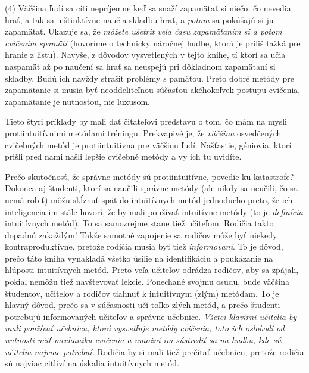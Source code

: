 (4) Väčšina ľudí sa cíti nepríjemne keď sa snaží zapamätať si niečo, čo nevedia hrať, a tak sa inštinktívne naučia skladbu hrať, a \textit{potom} sa pokúšajú si ju zapamätať. Ukazuje sa, že \emph{môžete ušetriť veľa času zapamätaním si a potom cvičením spamäti} (hovoríme o technicky náročnej hudbe, ktorá je príliš ťažká pre hranie z listu). Navyše, z dôvodov vysvetlených v tejto knihe, tí ktorí sa učia naspamäť až po naučení sa hrať sa neuspejú pri dôkladnom zapamätaní si skladby. Budú ich navždy strašiť problémy s pamäťou. Preto dobré metódy pre zapamätanie si musia byť neoddeliteľnou súčasťou akéhokoľvek postupu cvičenia, zapamätanie je nutnosťou, nie luxusom.

Tieto štyri príklady by mali dať čitateľovi predstavu o tom, čo mám na mysli protiintuitívnimi metódami tréningu. Prekvapivé je, že \textit{väčšina} osvedčených cvičebných metód je protiintuitívna pre väčšinu ľudí. Našťastie, géniovia, ktorí prišli pred nami našli lepšie cvičebné metódy a vy ich tu uvidíte.

Prečo skutočnosť, že správne metódy sú protiintuitívne, povedie ku katastrofe? Dokonca aj študenti, ktorí sa naučili správne metódy (ale nikdy sa neučili, čo sa nemá robiť) môžu skĺznuť späť do intuitívnych metód jednoducho preto, že ich inteligencia im stále hovorí, že by mali používať intuitívne metódy (to je \textit{definícia} intuitívnych metód). To sa samozrejme stane tiež učiteľom. Rodičia  takto dopadnú zakaždým! Takže samotné zapojenie sa rodičov môže byť niekedy kontraproduktívne, pretože rodičia musia byť tiež \textit{informovaní}. To je dôvod, prečo táto kniha vynakladá všetko úsilie na identifikáciu a poukázanie na hlúposti intuitívnych metód. Preto veľa učiteľov odrádza rodičov, aby sa zpájali, pokiaľ nemôžu tiež navštevovať lekcie. Ponechané svojmu osudu, bude väčšina študentov, učiteľov a rodičov tiahnuť k intuitívnym (zlým) metódam. To je hlavný dôvod, prečo sa v súčasnosti učí toľko zlých metód, a prečo študenti potrebujú informovaných  učiteľov a správne učebnice. \emph{Všetci klavírni učitelia by mali používať učebnicu, ktorá vysvetľuje metódy cvičenia; toto ich oslobodí od nutnosti učiť mechaniku cvičenia a umožní im sústrediť sa na hudbu, kde sú učitelia najviac potrební.} Rodičia by si mali tiež prečítať učebnicu, pretože rodičia sú najviac citliví na úskalia intuitívnych metód.

